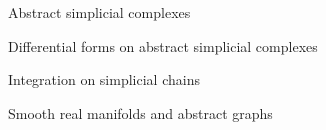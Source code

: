 \documentclass[../main.tex]{subfiles}
\begin{document}
\begin{subsection}{Abstract simplicial complexes}
        
\end{subsection}
\begin{subsection}{Differential forms on abstract simplicial complexes}
        
\end{subsection}
\begin{subsection}{Integration on simplicial chains}
    
\end{subsection}
\begin{subsection}{Smooth real manifolds and abstract graphs}
    
\end{subsection}
\end{document}
